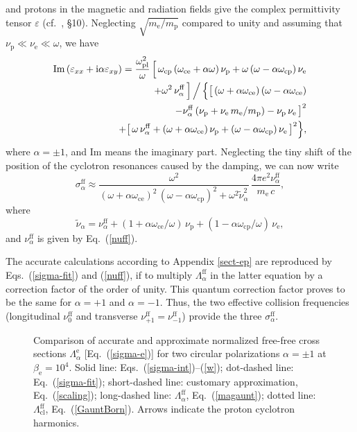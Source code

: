 \documentclass{emulateapj}
\newcommand{\beq}{\begin{equation}}
\newcommand{\eeq}{\end{equation}}
\newcommand{\bea}{\begin{eqnarray}}
\newcommand{\eea}{\end{eqnarray}}
\newcommand{\req}[1]{Eq.\ (\ref{#1})}
\newcommand{\mel}{m_\mathrm{e}}
\newcommand{\mpr}{m_\mathrm{p}}
\newcommand{\omc}{\omega_\mathrm{ce}}
\newcommand{\omp}{\omega_\mathrm{cp}}
\begin{document}
and protons in the magnetic and radiation fields
give the complex permittivity tensor $\varepsilon$ 
(cf.\ \citealp{Ginzburg}, \S10).
Neglecting $\sqrt{\mel/\mpr}$ compared to unity and
assuming that $\nu_\mathrm{p}\ll\nu_\mathrm{e}\ll \omega$,
we have
\bea
&&\hspace*{-1em}
   \mathrm{Im}\,(\varepsilon_{xx}+\mathrm{i}\alpha\varepsilon_{xy})
      = \frac{\omega_\mathrm{pl}^2}{\omega}\,
      \Big[\,\omega_\mathrm{cp}\,(\omc+\alpha\omega)\,\nu_\mathrm{p}
     + \omega\,(\omega-\alpha\omega_\mathrm{cp})\,\nu_\mathrm{e} 
\nonumber\\&&
   + \omega^2\,\nu_\alpha^\mathrm{ff} \,\Big] 
\,\Big/\,
     \Big\{\big[\,(\omega + \alpha\omc)\,(\omega-\alpha\omc) 
 \nonumber\\&&\hspace*{5em}
         - \nu_\alpha^\mathrm{ff}\,(\nu_\mathrm{p}+\nu_\mathrm{e}\,\mel/\mpr)
       - \nu_\mathrm{p}\,\nu_\mathrm{e}
      \,\big]^2
\nonumber\\&&
     +\big[\,\omega\,\nu_\alpha^\mathrm{ff} 
     + (\omega+\alpha\omc)\,\nu_\mathrm{p}
     + (\omega-\alpha\omega_\mathrm{cp})\,\nu_\mathrm{e}\,\big]^2\Big\} ,
\eea
where $\alpha=\pm1$, and Im means the imaginary part. 
Neglecting the tiny shift of the position of the cyclotron 
resonances caused by the damping, we can now write
\beq
   \sigma_\alpha^\mathrm{ff} \approx
          \frac{\omega^2
          }{
          (\omega+\alpha\omc)^2\,(\omega-\alpha\omp)^2
             +\omega^2 \tilde\nu_\alpha^2}\, 
          \frac{4\pi e^2 \nu_{\alpha}^\mathrm{ff}
          }{ 
            \mel\, c},
\label{sigma-fit}
\eeq
where 
\beq
   \tilde\nu_\alpha = \nu_{\alpha}^\mathrm{ff}
        + (1+\alpha\omc/\omega)\,\nu_\mathrm{p}
        + (1-\alpha\omp/\omega)\,\nu_\mathrm{e},
\eeq
and
$\nu_{\alpha}^\mathrm{ff}$ is given by \req{nuff}.

The accurate calculations according to Appendix \ref{sect-ep}
are reproduced by Eqs.\ (\ref{sigma-fit}) and (\ref{nuff}), if to multiply 
$ \Lambda_\alpha^\mathrm{ff}$ in the latter equation by a correction factor
of the order of unity. This quantum correction factor
 proves to be the same for $\alpha=+1$ and $\alpha=-1$. Thus, the 
two effective collision frequencies (longitudinal $\nu_0^\mathrm{ff}$ 
and transverse $\nu_{+1}^\mathrm{ff}=\nu_{-1}^\mathrm{ff}$)
provide the three $\sigma_\alpha^\mathrm{ff}$.

\begin{figure}
\caption{Comparison of accurate and 
approximate normalized free-free
cross sections $\Lambda_\alpha^\mathrm{e}$
[\protect\req{sigma-e}]
for two circular polarizations $\alpha=\pm1$
at $\beta_\mathrm{e}=10^4$.
Solid line: Eqs.\ (\protect\ref{sigma-int})--(\protect\ref{w});
dot-dashed line: \protect\req{sigma-fit};
short-dashed line: customary approximation, \req{scaling};
long-dashed line: $\Lambda_\alpha^\mathrm{ff}$, \protect\req{magaunt};
dotted line: $\Lambda_\mathrm{cl}^\mathrm{ff}$,
\protect\req{GauntBorn}. Arrows indicate 
the proton cyclotron harmonics.
\label{fig-ql02}}
\end{figure}
\end{document}
